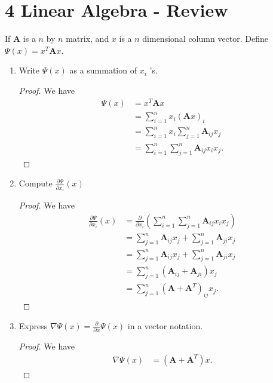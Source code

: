 \documentclass[10pt]{article}
\begin{document}
\section*{4 Linear Algebra - Review}
If $\mathbf{A}$ is a $n$ by $n$ matrix, and $x$ is a $n$ dimensional column vector. Define $\Psi(x)=x^{T} \mathbf{A} x$.

\begin{enumerate}
  \item Write $\Psi(x)$ as a summation of $x_{i}$ 's.
\begin{proof}
    We have
    \begin{align*}
        \Psi(x)&=x^{T} \mathbf{A} x\\
        &=\sum_{i=1}^{n} x_{i}(\mathbf{A} x)_{i}\\
        &=\sum_{i=1}^{n} x_{i}\sum_{j=1}^{n} \mathbf{A}_{ij}x_{j}\\
        &=\sum_{i=1}^{n}\sum_{j=1}^{n} \mathbf{A}_{ij}x_{i}x_{j}.
    \end{align*}
\end{proof}
  \item Compute $\frac{\partial \Psi}{\partial x_{i}}(x)$
    \begin{proof}
        We have
        \begin{align*}
            \frac{\partial \Psi}{\partial x_{i}}(x)&=\frac{\partial}{\partial x_{i}}\left(\sum_{i=1}^{n}\sum_{j=1}^{n} \mathbf{A}_{ij}x_{i}x_{j}\right)\\
            &=\sum_{j=1}^{n} \mathbf{A}_{ij}x_{j}+\sum_{j=1}^{n} \mathbf{A}_{ji}x_{j}\\
            &=\sum_{j=1}^{n} \mathbf{A}_{ij}x_{j}+\sum_{j=1}^{n} \mathbf{A}_{ji}x_{j}\\
            &=\sum_{j=1}^{n} (\mathbf{A}_{ij}+\mathbf{A}_{ji})x_{j}\\
            &=\sum_{j=1}^{n} (\mathbf{A}+\mathbf{A}^{T})_{ij}x_{j}.
        \end{align*}
    \end{proof}
  \item Express $\nabla \Psi(x)=\frac{\partial}{\partial x} \Psi(x)$ in a vector notation.
    \begin{proof}
        We have
        \begin{align*}
            \nabla \Psi(x)&=(\mathbf{A}+\mathbf{A}^{T})x.
        \end{align*}
    \end{proof}
\end{enumerate}
\end{document}
